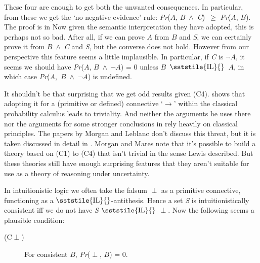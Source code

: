 \noindent These four are enough to get both the unwanted consequences. In particular, from these we get the `no negative evidence' rule: \textit{Pr}(\(A\), \(B\)~${\wedge}$~\textit{C})~${\geq}$ \textit{Pr}(\(A\), \(B\)). The proof is in \citet{MorganMares1995} Now given the semantic interpretation they have adopted, this is perhaps not so bad. After all, if we can prove \(A\) from \(B\) and \textit{S}, we can certainly prove it from \(B\)~${\wedge}$~\textit{C} and \textit{S}, but the converse does not hold. However from our perspective this feature seems a little implausible. In particular, if \textit{C} is ${\lnot}$\(A\), it seems we should have \textit{Pr}(\(A\), \(B\)~${\wedge}$~${\lnot}$\(A\)) = 0 unless \(B\)~{\small \(\sststile{\mathrm{IL}}{}\)}~\(A\), in which case \textit{Pr}(\(A\),~\(B\)~${\wedge}$~${\lnot}$\(A\)) is undefined.

It shouldn't be that surprising that we get odd results given (C4). \citet{Lewis1976b} shows that adopting it for a (primitive or defined) connective `${\rightarrow}$' within the classical probability calculus leads to triviality. And neither the arguments he uses there nor the arguments for some stronger conclusions in \citet{Lewis1999b} rely heavily on classical principles. The papers by Morgan and Leblanc don't discuss this threat, but it is taken discussed in detail in \citet{MorganMares1995}. Morgan and Mares note that it's possible to build a theory based on (C1) to (C4) that isn't trivial in the sense Lewis described. But these theories still have enough surprising features that they aren't suitable for use as a theory of reasoning under uncertainty.

In intuitionistic logic we often take the falsum ${\perp}$ as a primitive connective, functioning as a {\small \(\sststile{\mathrm{IL}}{}\)}\nobreakdash-antithesis. Hence a set \textit{S }is intuitionistically consistent iff we do not have \textit{S} {\small \(\sststile{\mathrm{IL}}{}\)} ${\perp}$. Now the following seems a plausible condition:

\begin{description}
\item[(C${\perp}$)]For consistent \(B\), \textit{Pr}(${\perp}$, \(B\)) = 0.
\end{description}

